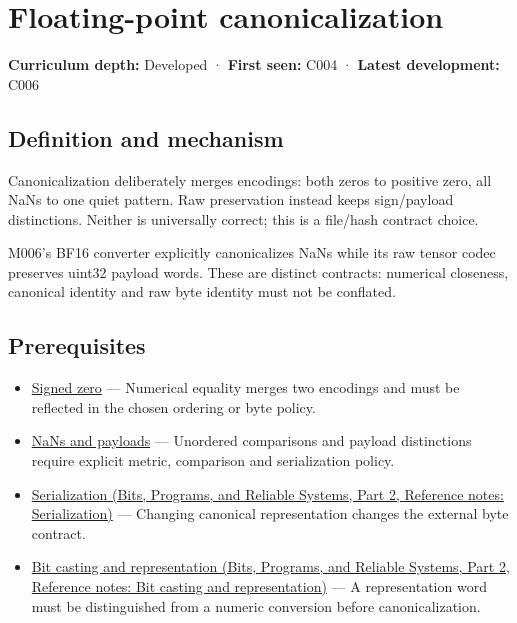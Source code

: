 \hypertarget{appendix-e90053a4b201}{}\label{referencestart:appendix-e90053a4b201}
\section{Floating-point canonicalization}\label{appendix-e90053a4b201-floating-point-canonicalization}

\hypertarget{appendix-e90053a4b201-floating-point-canonicalization}{}

\textbf{Curriculum depth:} Developed · \textbf{First seen:} C004 · \textbf{Latest development:} C006

\begin{allmightroledefinition}

\subsection{Definition and mechanism}\label{appendix-e90053a4b201-definition-and-mechanism}

\hypertarget{appendix-e90053a4b201-definition-and-mechanism}{}

Canonicalization deliberately merges encodings: both zeros to positive zero, all NaNs to one quiet pattern. Raw preservation instead keeps sign/payload distinctions. Neither is universally correct; this is a file/hash contract choice.

\end{allmightroledefinition}

M006's BF16 converter explicitly canonicalizes NaNs while its raw tensor codec preserves uint32 payload words. These are distinct contracts: numerical closeness, canonical identity and raw byte identity must not be conflated.

\subsection{Prerequisites}\label{appendix-e90053a4b201-prerequisites}

\hypertarget{appendix-e90053a4b201-prerequisites}{}

\begin{itemize}
\tightlist
\item
  \hyperref[appendix-3a048f032c1f]{Signed zero} --- Numerical equality merges two encodings and must be reflected in the chosen ordering or byte policy.
\item
  \hyperref[appendix-d6607cc4c235]{NaNs and payloads} --- Unordered comparisons and payload distinctions require explicit metric, comparison and serialization policy.
\item
  \href{../01-Bits-Programs-and-Reliable-Systems-P02/main.pdf\#appendix-91d09ebed979}{Serialization (Bits, Programs, and Reliable Systems, Part 2, Reference notes: Serialization)} --- Changing canonical representation changes the external byte contract.
\item
  \href{../01-Bits-Programs-and-Reliable-Systems-P02/main.pdf\#appendix-34ee45f161c1}{Bit casting and representation (Bits, Programs, and Reliable Systems, Part 2, Reference notes: Bit casting and representation)} --- A representation word must be distinguished from a numeric conversion before canonicalization.
\end{itemize}

